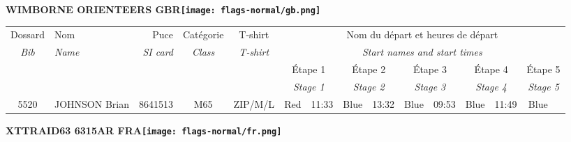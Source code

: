 \documentclass{report}
\begin{document}
\newpage
  \Huge \centering \bfseries WIMBORNE ORIENTEERS  GBR\normalfont \footnotesize \sffamily \hfill \texttt{[image: flags-normal/gb.png]} \newline 
  \begin{longtable}{|c|l|r|c|c|*{5}{cc|}}
    Dossard & Nom  & Puce    & Catégorie & T-shirt & \multicolumn{10}{c|}{Nom du départ et heures de départ} \\
    \itshape Bib     & \itshape Name & \itshape SI card & \itshape Class  & \itshape  T-shirt  & \multicolumn{10}{c|}{\itshape Start names and start times} \\
    \hline
    & & & & & \multicolumn{2}{c|}{Étape 1} & \multicolumn{2}{c|}{Étape 2} & \multicolumn{2}{c|}{Étape 3} & \multicolumn{2}{c|}{Étape 4} & \multicolumn{2}{c|}{Étape 5} \\
    & & & & & \multicolumn{2}{c|}{\itshape Stage 1} & \multicolumn{2}{c|}{\itshape Stage 2} & \multicolumn{2}{c|}{\itshape Stage 3} & \multicolumn{2}{c|}{\itshape Stage 4} & \multicolumn{2}{c|}{\itshape Stage 5} \\
    \hline
    5520 & JOHNSON Brian & 8641513 & M65 & ZIP/M/L & Red & 11:33 & Blue & 13:32 & Blue & 09:53 & Blue & 11:49 & Blue &  \\
  \end{longtable}
\newpage
  \Huge \centering \bfseries XTTRAID63 6315AR FRA\normalfont \footnotesize \sffamily \hfill \texttt{[image: flags-normal/fr.png]} \newline 
\end{document}
